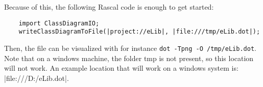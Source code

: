 	Because of this, the following Rascal code is enough to get started:
	
	\begin{lstlisting}
	import ClassDiagramIO;
	writeClassDiagramToFile(|project://eLib|, |file:///tmp/eLib.dot|);
	\end{lstlisting}
	
	Then, the file can be visualized with for instance \texttt{dot -Tpng -O /tmp/eLib.dot}.
	Note that on a windows machine, the folder tmp is not present, so this location will not work. 
	An example location that will work on a windows system is: |file:///D:/eLib.dot|.
